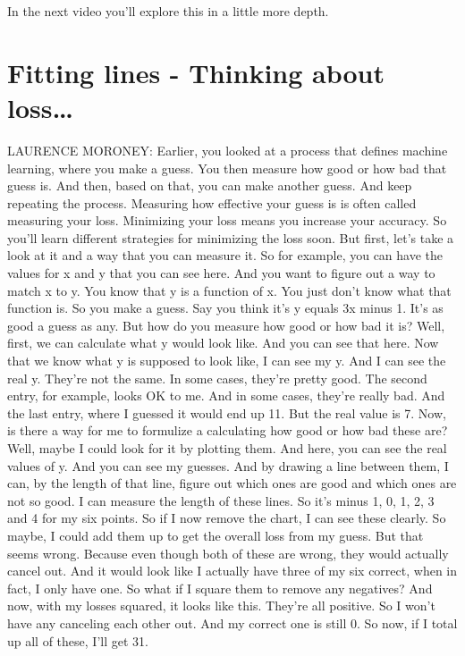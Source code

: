 In the next video you'll explore this in a little more depth.

\section{Fitting lines - Thinking about loss\ldots}

LAURENCE MORONEY: Earlier, you looked at a process
that defines machine learning, where you make a guess.
You then measure how good or how bad that guess is.
And then, based on that, you can make another guess.
And keep repeating the process.
Measuring how effective your guess is is often called measuring your loss.
Minimizing your loss means you increase your accuracy.
So you'll learn different strategies for minimizing the loss soon.
But first, let's take a look at it and a way that you can measure it.
So for example, you can have the values for x and y that you can see here.
And you want to figure out a way to match x to y.
You know that y is a function of x.
You just don't know what that function is.
So you make a guess.
Say you think it's y equals 3x minus 1.
It's as good a guess as any.
But how do you measure how good or how bad it is?
Well, first, we can calculate what y would look like.
And you can see that here.
Now that we know what y is supposed to look like, I can see my y.
And I can see the real y.
They're not the same.
In some cases, they're pretty good.
The second entry, for example, looks OK to me.
And in some cases, they're really bad.
And the last entry, where I guessed it would end up 11.
But the real value is 7.
Now, is there a way for me to formulize a calculating how good
or how bad these are?
Well, maybe I could look for it by plotting them.
And here, you can see the real values of y.
And you can see my guesses.
And by drawing a line between them, I can, by the length of that line,
figure out which ones are good and which ones are not so good.
I can measure the length of these lines.
So it's minus 1, 0, 1, 2, 3 and 4 for my six points.
So if I now remove the chart, I can see these clearly.
So maybe, I could add them up to get the overall loss from my guess.
But that seems wrong.
Because even though both of these are wrong, they would actually cancel out.
And it would look like I actually have three of my six correct,
when in fact, I only have one.
So what if I square them to remove any negatives?
And now, with my losses squared, it looks like this.
They're all positive.
So I won't have any canceling each other out.
And my correct one is still 0.
So now, if I total up all of these, I'll get 31.
